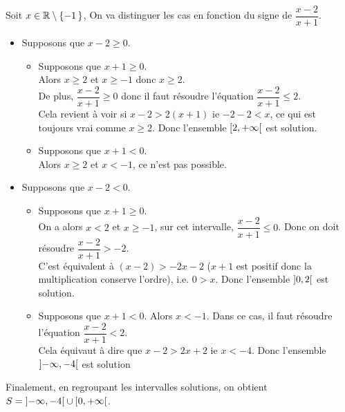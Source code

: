 \documentclass{fancybook}
\begin{document}
\begin{solution}
Soit $x \in \setRealNumbers \setminus \set{-1}$,
On va distinguer les cas en fonction du signe de $\dfrac{x-2}{x+1}$.
\begin{itemize}
\item Supposons que $x-2 \ge 0$.
\begin{itemize}
\item Supposons que $x+1 \ge 0$.\\
Alors $x \ge 2$ et $x \ge -1$ donc $x \ge 2$.\\
De plus, $\dfrac{x-2}{x+1} \ge 0$ donc il faut résoudre l'équation $\dfrac{x-2}{x+1} \le 2$.\\
Cela revient à voir si $x-2 > 2(x+1)$ ie $-2-2 < x$, ce qui est toujours vrai comme $x \ge 2$. Donc l'ensemble $\left[ 2 , +\infty \right[$ est solution.
\item Supposons que $x+1 < 0$.\\
Alors $x \ge 2$ et $x < -1$, ce n'est pas possible.
\end{itemize}
\item Supposons que $x-2 < 0$.
\begin{itemize}
\item Supposons que $x+1 \ge 0$.\\
On a alors $x < 2$ et $x \ge -1$, sur cet intervalle, $\dfrac{x-2}{x+1} \le 0$.
Donc on doit résoudre $\dfrac{x-2}{x+1} > -2$. \\
C'est équivalent à $(x-2) > -2x - 2$ ($x+1$ est positif donc la multiplication conserve l'ordre), i.e. $0 >x$. Donc l'ensemble $\left] 0 , 2 \right[$  est solution.
\item Supposons que $x+1 < 0$.
Alors $x < -1$. Dans ce cas, il faut résoudre l'équation $\dfrac{x-2}{x+1} < 2$.\\
Cela équivaut à dire que $x - 2 > 2x + 2$ ie $x < -4$. Donc l'ensemble $\left] -\infty , -4 \right[$ est solution
\end{itemize}
\end{itemize}
 
Finalement, en regroupant les intervalles solutions, on obtient $S = \left] -\infty , -4 \right[ \cup \left[ 0 , +\infty \right[$.
\end{solution}
\end{document}
